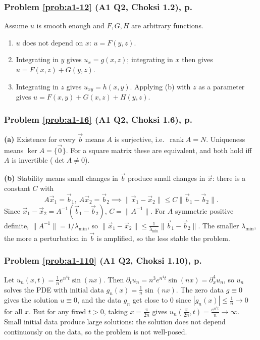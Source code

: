 \documentclass{article}
\begin{document}
\label{sol:a1-12}
\subsubsection*{Problem \ref{prob:a1-12} (A1 Q2, Choksi 1.2), p.~\pageref{prob:a1-12}}
Assume $u$ is smooth enough and $F, G, H$ are arbitrary functions.
\begin{enumerate}[label=(\alph*)]
    \item $u$ does not depend on $x$: $u = F(y,z)$.
    \item Integrating in $y$ gives $u_x = g(x,z)$; integrating in $x$ then gives $u = F(x,z) + G(y,z)$.
    \item Integrating in $z$ gives $u_{xy} = h(x,y)$. Applying (b) with $z$ as a parameter gives $u = F(x,y) + G(x,z) + H(y,z)$.
\end{enumerate}

\label{sol:a1-16}
\subsubsection*{Problem \ref{prob:a1-16} (A1 Q2, Choksi 1.6), p.~\pageref{prob:a1-16}}
\textbf{(a)} Existence for every $\vec{b}$ means $A$ is surjective, i.e.\ $\operatorname{rank}A = N$. Uniqueness means $\ker A = \{\vec{0}\}$. For a square matrix these are equivalent, and both hold iff $A$ is invertible ($\det A \neq 0$).

\textbf{(b)} Stability means small changes in $\vec{b}$ produce small changes in $\vec{x}$: there is a constant $C$ with
\begin{equation*}
    A\vec{x}_1 = \vec{b}_1,\ A\vec{x}_2 = \vec{b}_2 \implies \|\vec{x}_1 - \vec{x}_2\| \leq C\|\vec{b}_1 - \vec{b}_2\|.
\end{equation*}
Since $\vec{x}_1 - \vec{x}_2 = A^{-1}(\vec{b}_1 - \vec{b}_2)$, $C = \|A^{-1}\|$. For $A$ symmetric positive definite, $\|A^{-1}\| = 1/\lambda_{\min}$, so $\|\vec{x}_1 - \vec{x}_2\| \leq \frac{1}{\lambda_{\min}}\|\vec{b}_1 - \vec{b}_2\|$. The smaller $\lambda_{\min}$, the more a perturbation in $\vec{b}$ is amplified, so the less stable the problem.

\label{sol:a1-110}
\subsubsection*{Problem \ref{prob:a1-110} (A1 Q2, Choksi 1.10), p.~\pageref{prob:a1-110}}
Let $u_n(x,t) = \frac1n e^{n^4t}\sin(nx)$. Then $\partial_tu_n = n^3e^{n^4t}\sin(nx) = \partial_x^4u_n$, so $u_n$ solves the PDE with initial data $g_n(x) = \frac1n\sin(nx)$. The zero data $g \equiv 0$ gives the solution $u \equiv 0$, and the data $g_n$ get close to $0$ since $|g_n(x)| \leq \frac1n \to 0$ for all $x$. But for any fixed $t > 0$, taking $x = \frac{\pi}{2n}$ gives $u_n(\frac{\pi}{2n},t) = \frac{e^{n^4t}}{n} \to \infty$. Small initial data produce large solutions: the solution does not depend continuously on the data, so the problem is not well-posed.
\end{document}
